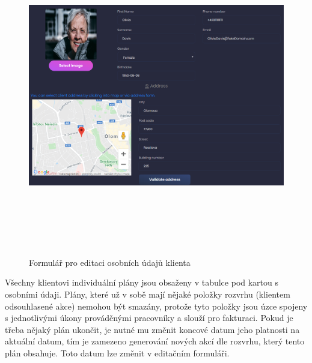 \documentclass[
  biblatex,
  glossaries,
  index
]{kidiplom}
\begin{document}
\begin{figure}[H]
  	\centering
 	 \includegraphics[width=14cm,height=14cm,keepaspectratio]{client_general_info}
 	 \caption{Formulář pro editaci osobních údajů klienta}
 	 \label{fig:clientGeneralInfo}
\end{figure}

Všechny klientovi individuální plány jsou obsaženy v tabulce pod kartou s osobními údaji. Plány, které už v sobě mají nějaké položky rozvrhu (klientem odsouhlasené akce) nemohou být smazány, protože tyto položky jsou úzce spojeny s jednotlivými úkony prováděnými pracovníky a slouží pro fakturaci. Pokud je třeba nějaký plán ukončit, je nutné mu změnit koncové datum jeho platnosti na aktuální datum, tím je zamezeno generování nových akcí dle rozvrhu, který tento plán obsahuje. Toto datum lze změnit v editačním formuláři.
\end{document}
